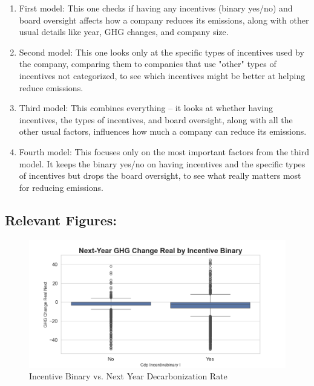 \begin{enumerate}
    \item First model: This one checks if having any incentives (binary yes/no) and board oversight affects how a company reduces its emissions, along with other usual details like year, GHG changes, and company size.
    \item Second model: This one looks only at the specific types of incentives used by the company, comparing them to companies that use "other" types of incentives not categorized, to see which incentives might be better at helping reduce emissions.
    \item Third model: This combines everything – it looks at whether having incentives, the types of incentives, and board oversight, along with all the other usual factors, influences how much a company can reduce its emissions.
    \item Fourth model: This focuses only on the most important factors from the third model. It keeps the binary yes/no on having incentives and the specific types of incentives but drops the board oversight, to see what really matters most for reducing emissions.
\end{enumerate}




\subsection{Relevant Figures:}
\begin{figure}[H]
\centering
    \includegraphics[width=\textwidth]{figures/ghg_change_real_next_by_cdp_incentivebinary_i.png}
\caption{Incentive Binary vs. Next Year Decarbonization Rate}
\label{fig:ghg_change_real_next_by_cdp_incentivebinary_i}
\end{figure}

